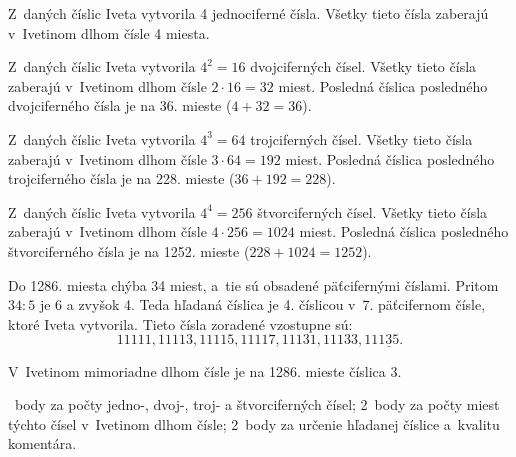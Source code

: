 {%
Z~daných číslic Iveta vytvorila 4 jednociferné čísla.
Všetky tieto čísla zaberajú v~Ivetinom dlhom čísle 4 miesta.

Z~daných číslic Iveta vytvorila $4^2=16$ dvojciferných čísel.
Všetky tieto čísla zaberajú v~Ivetinom dlhom čísle $2\cdot16=32$ miest.
Posledná číslica posledného dvojciferného čísla je na 36. mieste ($4+32=36$).

Z~daných číslic Iveta vytvorila $4^3=64$ trojciferných čísel.
Všetky tieto čísla zaberajú v~Ivetinom dlhom čísle $3\cdot64=192$ miest.
Posledná číslica posledného trojciferného čísla je na 228. mieste ($36+192=228$).

Z~daných číslic Iveta vytvorila $4^4=256$ štvorciferných čísel.
Všetky tieto čísla zaberajú v~Ivetinom dlhom čísle $4\cdot256=1024$ miest.
Posledná číslica posledného štvorciferného čísla je na 1252. mieste ($228+1024=1252$).

Do 1286. miesta chýba 34 miest, a~tie sú obsadené päťcifernými číslami.
Pritom $34:5$ je 6 a zvyšok 4.
Teda hľadaná číslica je 4. číslicou v~7. päťcifernom čísle, ktoré Iveta vytvorila.
Tieto čísla zoradené vzostupne sú:
$$
11111, 11113, 11115, 11117, 11131, 11133, 111\underline{3}5.
$$

V~Ivetinom mimoriadne dlhom čísle je na 1286. mieste číslica 3.

~body za počty jedno-, dvoj-, troj- a štvorciferných čísel;
2~body za počty miest týchto čísel v~Ivetinom dlhom čísle;
2~body za určenie hľadanej číslice a~kvalitu komentára.
\endhodnotenie}

